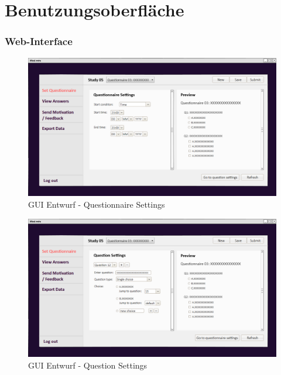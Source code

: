 \documentclass[a4paper]{scrreprt}
\begin{document}
    \chapter{Benutzungsoberfläche}
        \subsection{\gls{Web-Interface}}
            \begin{figure}[ht]
                \centering
                \includegraphics[scale = 0.25]{web_set1.png}
                \caption{GUI Entwurf - Questionnaire Settings}
            \end{figure}

	        \begin{figure}[ht]
	        	\centering
	        	\includegraphics[scale = 0.25]{web_set2.png}
	        	\caption{GUI Entwurf - Question Settings}
	        \end{figure}
\end{document}
